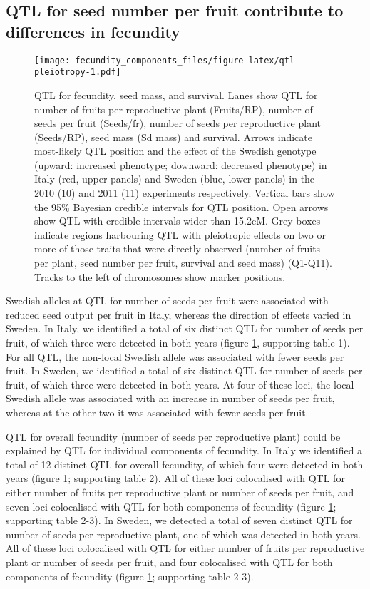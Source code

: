 \documentclass[12pt,]{article}
\begin{document}
\hypertarget{qtl-for-seed-number-per-fruit-contribute-to-differences-in-fecundity}{%
\subsection{QTL for seed number per fruit contribute to differences in fecundity}\label{qtl-for-seed-number-per-fruit-contribute-to-differences-in-fecundity}}

\begin{figure}
\centering
\texttt{[image: fecundity\_components\_files/figure-latex/qtl-pleiotropy-1.pdf]}
\caption{\label{fig:qtl-pleiotropy}QTL for fecundity, seed mass, and survival. Lanes show QTL for number of fruits per reproductive plant (Fruits/RP), number of seeds per fruit (Seeds/fr), number of seeds per reproductive plant (Seeds/RP), seed mass (Sd mass) and survival. Arrows indicate most-likely QTL position and the effect of the Swedish genotype (upward: increased phenotype; downward: decreased phenotype) in Italy (red, upper panels) and Sweden (blue, lower panels) in the 2010 (10) and 2011 (11) experiments respectively. Vertical bars show the 95\% Bayesian credible intervals for QTL position. Open arrows show QTL with credible intervals wider than 15.2cM. Grey boxes indicate regions harbouring QTL with pleiotropic effects on two or more of those traits that were directly observed (number of fruits per plant, seed number per fruit, survival and seed mass) (Q1-Q11). Tracks to the left of chromosomes show marker positions.}
\end{figure}

Swedish alleles at QTL for number of seeds per fruit were associated with reduced seed output per fruit in Italy, whereas the direction of effects varied in Sweden.
In Italy, we identified a total of six distinct QTL for number of seeds per fruit, of which three were detected in both years (figure \ref{fig:qtl-pleiotropy}, supporting table 1).
For all QTL, the non-local Swedish allele was associated with fewer seeds per fruit.
In Sweden, we identified a total of six distinct QTL for number of seeds per fruit, of which three were detected in both years.
At four of these loci, the local Swedish allele was associated with an increase in number of seeds per fruit, whereas at the other two it was associated with fewer seeds per fruit.

QTL for overall fecundity (number of seeds per reproductive plant) could be explained by QTL for individual components of fecundity.
In Italy we identified a total of 12 distinct QTL for overall fecundity, of which four were detected in both years (figure \ref{fig:qtl-pleiotropy}; supporting table 2).
All of these loci colocalised with QTL for either number of fruits per reproductive plant or number of seeds per fruit, and seven loci colocalised with QTL for both components of fecundity (figure \ref{fig:qtl-pleiotropy}; supporting table 2-3).
In Sweden, we detected a total of seven distinct QTL for number of seeds per reproductive plant, one of which was detected in both years.
All of these loci colocalised with QTL for either number of fruits per reproductive plant or number of seeds per fruit, and four colocalised with QTL for both components of fecundity (figure \ref{fig:qtl-pleiotropy}; supporting table 2-3).
\end{document}

